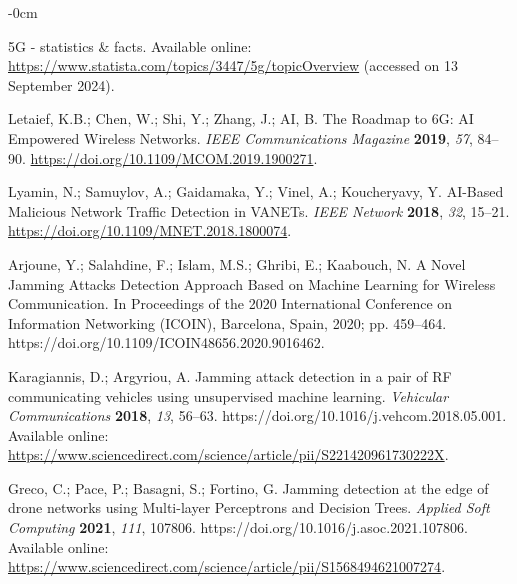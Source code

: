 \documentclass[futureinternet,article,submit,pdftex,moreauthors]{Definitions/mdpi}
\begin{document}
\begin{adjustwidth}{-\extralength}{0cm}


\begin{thebibliography}{999}

5G - statistics \& facts. Available online: \url{https://www.statista.com/topics/3447/5g/topicOverview} (accessed on 13 September 2024).

Letaief, K.B.; Chen, W.; Shi, Y.; Zhang, J.; AI, B. The Roadmap to 6G: AI Empowered Wireless Networks. {\em IEEE Communications Magazine} {\bf 2019}, {\em 57}, 84--90. \url{https://doi.org/10.1109/MCOM.2019.1900271}.

Lyamin, N.; Samuylov, A.; Gaidamaka, Y.; Vinel, A.; Koucheryavy, Y. AI-Based Malicious Network Traffic Detection in VANETs. {\em IEEE Network} {\bf 2018}, {\em 32}, 15--21. \url{https://doi.org/10.1109/MNET.2018.1800074}.

Arjoune, Y.; Salahdine, F.; Islam, M.S.; Ghribi, E.; Kaabouch, N. A Novel Jamming Attacks Detection Approach Based on Machine Learning for Wireless Communication. In Proceedings of the 2020 International Conference on Information Networking (ICOIN), Barcelona, Spain, 2020; pp. 459--464. https://doi.org/10.1109/ICOIN48656.2020.9016462.

Karagiannis, D.; Argyriou, A. Jamming attack detection in a pair of RF communicating vehicles using unsupervised machine learning. {\em Vehicular Communications} {\bf 2018}, {\em 13}, 56--63. https://doi.org/10.1016/j.vehcom.2018.05.001. Available online: \url{https://www.sciencedirect.com/science/article/pii/S221420961730222X}.

Greco, C.; Pace, P.; Basagni, S.; Fortino, G. Jamming detection at the edge of drone networks using Multi-layer Perceptrons and Decision Trees. {\em Applied Soft Computing} {\bf 2021}, {\em 111}, 107806. https://doi.org/10.1016/j.asoc.2021.107806. Available online: \url{https://www.sciencedirect.com/science/article/pii/S1568494621007274}.


\end{thebibliography}
\end{adjustwidth}
\end{document}
